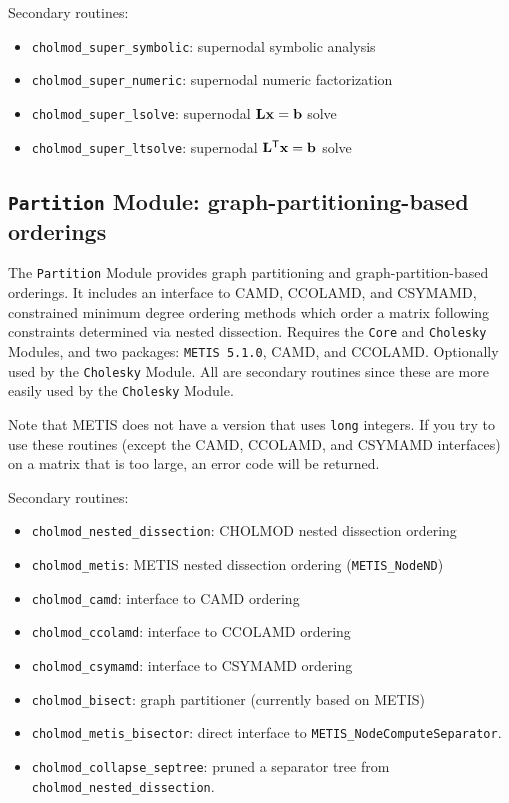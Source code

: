 \documentclass[11pt]{article}
\newcommand{\m}[1]{{\bf{#1}}}       %
\newcommand{\tr}{^{\sf T}}          %
\begin{document}
\vspace{0.1in}
\noindent Secondary routines:
    \begin{itemize}
    \item {\tt cholmod\_super\_symbolic}: supernodal symbolic analysis
    \item {\tt cholmod\_super\_numeric}: supernodal numeric factorization
    \item {\tt cholmod\_super\_lsolve}: supernodal $\m{Lx}=\m{b}$ solve
    \item {\tt cholmod\_super\_ltsolve}: supernodal $\m{L}\tr\m{x}=\m{b}$ solve
    \end{itemize}

\subsection{{\tt Partition} Module: graph-partitioning-based orderings}

The {\tt Partition} Module provides
graph partitioning and graph-partition-based orderings.  It includes an
interface to CAMD, CCOLAMD, and CSYMAMD, constrained minimum degree ordering
methods which order a matrix following constraints determined via nested
dissection.
Requires the {\tt Core} and {\tt Cholesky} Modules, and two packages: {\tt METIS 5.1.0}, CAMD, and CCOLAMD.
Optionally used by the {\tt Cholesky} Module.  All are secondary routines since
these are more easily used by the {\tt Cholesky} Module.

Note that METIS does not have a version that uses {\tt long} integers.  If you try to use
these routines (except the CAMD, CCOLAMD, and CSYMAMD interfaces)
on a matrix that is too large, an error code will be returned.

\vspace{0.1in}
\noindent Secondary routines:
    \begin{itemize}
    \item {\tt cholmod\_nested\_dissection}: CHOLMOD nested dissection ordering
    \item {\tt cholmod\_metis}: METIS nested dissection ordering ({\tt METIS\_NodeND})
    \item {\tt cholmod\_camd}: interface to CAMD ordering
    \item {\tt cholmod\_ccolamd}: interface to CCOLAMD ordering
    \item {\tt cholmod\_csymamd}: interface to CSYMAMD ordering
    \item {\tt cholmod\_bisect}: graph partitioner (currently based on METIS)
    \item {\tt cholmod\_metis\_bisector}: direct interface to {\tt METIS\_NodeComputeSeparator}.
    \item {\tt cholmod\_collapse\_septree}: pruned a separator tree from
    {\tt cholmod\_nested\_dissection}.
    \end{itemize}
\end{document}
